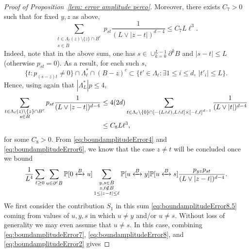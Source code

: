 \documentclass[11pt,a4paper]{article}
\numberwithin{equation}{section}
\theoremstyle{plain}
\theoremstyle{definition}
\newcommand{\connect}{\xleftrightarrow}
\begin{document}
\begin{proof}[Proof of Proposition~\textup{\ref{lem: error amplitude perco}}]
Moreover, there exists $C_7>0$ such that for fixed $y,z$ as above,
\begin{equation}\label{eq:boundamplitudeError8}
	\sum_{\substack{ t\in \Lambda_\ell(z)\setminus \{z\}\cap B^c\\s\in B}}p_{st}\frac{1}{(L\vee|z-t|)^{d-4}}\leq C_7 L\ell^3.
\end{equation}
Indeed, note that in the above sum, one has $s \in \cup_{k=0}^{L-1}\partial^k B$ and $|s-t|\leq L$ (otherwise $p_{st}=0$). As a result, for each such $s$,
\begin{equation}
	\{t: p_{(s-z)t}\neq 0\}\cap\Lambda_\ell^*\cap (B-z)^c\subset \{t'\in \Lambda_\ell: \exists 1\leq i \leq d, \: |t'_i|\leq L\}.
\end{equation}
Hence, using again that $|\Lambda_L^*|p\leq 4$,
\begin{align}	\sum_{\substack{ t\in \Lambda_\ell(z)\setminus \{z\}\cap B^c\\s\in B}}p_{st}\frac{1}{(L\vee|z-t|)^{d-4}}&\leq 4(2d)\sum_{\substack{t\in \Lambda_\ell\setminus \{0\}\cap [-(L\wedge \ell),L\wedge \ell]\times [-\ell,\ell]^{d-1}}}\frac{1}{(L\vee|t|)^{d-4}}\notag\\
	&\leq C_8L\ell^3,
\end{align}
for some $C_8>0$. From \eqref{eq:boundamplitudeError4} and \eqref{eq:boundamplitudeError6}, we know that the case $z\neq t$ will be concluded once we bound
\begin{equation}\label{eq:boundamplitudeError8.5}
	\frac{1}{L^4}\sum_{\ell\geq 0}\sum_{u\in \partial^\ell B}\mathbb P[0 \connect{B\:}u]\sum_{\substack{y,s\in B\\ z,t\notin B\\ 1\leq|z-t|\leq \ell}}\mathbb P[u \connect{B\:}y]\mathbb P[u\connect{B\:}s]\frac{p_{yz}p_{st}}{(L\vee|z-t|)^{d-4}}.
\end{equation}
We first consider the contribution $S_1$ in this sum \eqref{eq:boundamplitudeError8.5} coming from values of $u,y,s$ in which $u\neq y$ and/or $u\neq s$. Without loss of generality we may even assume that $u\neq s$. In this case, combining \eqref{eq:boundamplitudeError7}, \eqref{eq:boundamplitudeError8}, and \eqref{eq:boundamplitudeError2} gives 

\end{proof}
\end{document}
